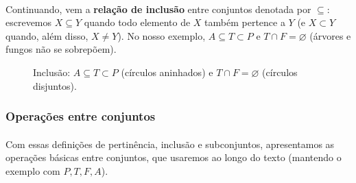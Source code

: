 \documentclass[12pt,a4paper]{article}
\begin{document}
\paragraph{}
Continuando, vem a \textbf{relação de inclusão} entre conjuntos denotada por \(\subseteq\): escrevemos \(X \subseteq Y\) quando todo elemento de \(X\) também pertence a \(Y\) (e \(X\subset Y\) quando, além disso, \(X\neq Y\)). No nosso exemplo, \(A\subseteq T\subset P\) e \(T\cap F=\varnothing\) (árvores e fungos não se sobrepõem).

\begin{figure}[H]
    \centering
    \caption{Inclusão: $A\subseteq T\subset P$ (círculos aninhados) e $T\cap F=\varnothing$ (círculos disjuntos).}
    \label{fig:inclusao}
\end{figure}

\subsubsection{Operações entre conjuntos}
\paragraph{}
Com essas definições de pertinência, inclusão e subconjuntos, apresentamos as operações básicas entre conjuntos, que usaremos ao longo do texto (mantendo o exemplo com \(P,T,F,A\)).
\end{document}

